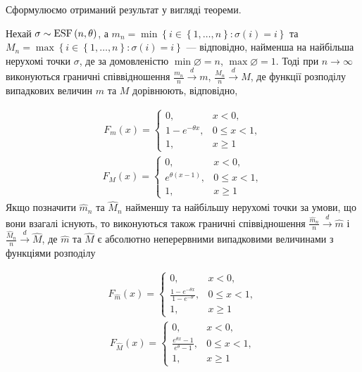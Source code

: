 Сформулюємо отриманий результат у вигляді теореми.
\begin{theorem}
    Нехай $\sigma \sim \mathrm{ESF}\left(n, \theta\right)$, а 
    $m_n = \min\left\{i\in \left\{1,\dots,n\right\}: \sigma(i) = i\right\}$
    та $M_n = \max\left\{i\in \left\{1,\dots,n\right\}: \sigma(i) = i\right\}$ --- відповідно,
    найменша на найбільша нерухомі точки $\sigma$, де за домовленістю
    $\min \varnothing = n$, $\max \varnothing = 1$. Тоді при $n\to\infty$ виконуються граничні
    співвідношення
    $\frac{m_n}{n} \overset{d}{\longrightarrow} m$, $\frac{M_n}{n} \overset{d}{\longrightarrow} M$,
    де функції розподілу випадкових величин $m$ та $M$ дорівнюють, відповідно,

    \begin{gather}
        F_m(x) = \begin{cases}
            0, & x < 0, \\
            1 - e^{-\theta x}, & 0 \leq x < 1, \\
            1, & x \geq 1
        \end{cases}
    \end{gather}
    \begin{gather}
        F_M(x) = \begin{cases}
            0, & x < 0, \\
            e^{\theta(x - 1)}, & 0 \leq x < 1, \\
            1, & x \geq 1
        \end{cases}
    \end{gather}
    Якщо позначити $\widehat{m}_n$ та $\widehat{M}_n$ найменшу та найбільшу нерухомі точки
    за умови, що вони взагалі існують, то виконуються також граничні співвідношення
    $\frac{\widehat{m}_n}{n} \overset{d}{\longrightarrow} \widehat{m}$ і
    $\frac{\widehat{M}_n}{n} \overset{d}{\longrightarrow} \widehat{M}$, де
    $\widehat{m}$ та $\widehat{M}$ є абсолютно неперервними випадковими величинами
    з функціями розподілу

    \begin{gather}
        F_{\widehat{m}}(x) = \begin{cases}
            0, & x < 0, \\
            \frac{1 - e^{-\theta x}}{1 - e^{-\theta}}, & 0 \leq x < 1, \\
            1, & x \geq 1
        \end{cases}
    \end{gather}
    \begin{gather}
        F_{\widehat{M}}(x) = \begin{cases}
            0, & x < 0, \\
            \frac{e^{\theta x} - 1}{e^{\theta} - 1}, & 0 \leq x < 1, \\
            1, & x \geq 1
        \end{cases}
    \end{gather}
\end{theorem}

